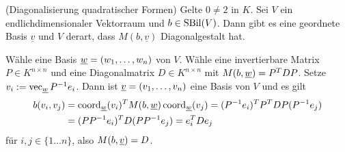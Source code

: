 \documentclass[../../main.tex]{subfiles}
\begin{document}
\begin{kor}\label{13.5.12} (Diagonalisierung quadratischer Formen) 
	Gelte $0\neq 2$ in $K$. Sei $V$ ein endlichdimensionaler Vektorraum und $b\in \operatorname{SBil}(V)$. Dann gibt es eine geordnete Basis $\underline{v}$ und $V$ derart, dass $M(b,\underline{v})$ Diagonalgestalt hat.
\end{kor}
\begin{cproof}
	Wähle eine Basis ${\underline w}=(w_1,\ldots ,w_n)$ von $V$. Wähle eine invertierbare Matrix $P\in K^{n\times n}$ und eine Diagonalmatrix $D\in K^{n\times n}$ mit $M(b,{\underline w})=P^TDP$. Setze $v_i:=\operatorname{vec}_{{\underline w}} P^{-1}e_i$. Dann ist ${\underline v}=(v_1,\ldots ,v_n)$ eine Basis von $V$ und es gilt
	\begin{align*}
		b(v_i,v_j)&=\operatorname{coord}_{{\underline w}}(v_i)^T M(b,{\underline w})\operatorname{coord}_{{\underline w}}(v_j)=(P^{-1}e_i)^TP^TDP(P^{-1}e_j)\\
		&=(PP^{-1}e_i)^TD(PP^{-1}e_j)=e_i^TDe_j
	\end{align*}
	für $i,j\in\{1\ldots n\}$, also $M(b,{\underline v})=D$.
\end{cproof}
\end{document}
